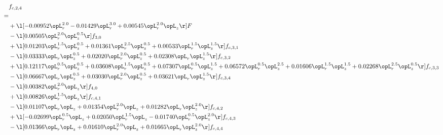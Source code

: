 \begin{alignat}{2} 
\label{eq:f_24_2} 
& f_{c,2,4} \nonumber \\ 
 = \\ 
& + \l[  -0.00952 \opL_r^{2.0}   -0.01429 \opL_r^{3.0} +  0.00545 \opL_r^{2.0} \opL_z  \r] F \nonumber \\ 
& - \l[  0.00505 \opL_r^{2.0} \opL_z^{0.5}  \r] f_{3,0} \nonumber \\ 
& + \l[  0.01203 \opL_r^{1.5} \opL_z^{0.5} +  0.01361 \opL_r^{2.5} \opL_z^{0.5} +  0.00533 \opL_r^{1.5} \opL_z^{1.5}  \r] f_{c,3,1} \nonumber \\ 
& - \l[  0.03333 \opL_r \opL_z^{0.5} +  0.02020 \opL_r^{2.0} \opL_z^{0.5} +  0.02308 \opL_r \opL_z^{1.5}  \r] f_{c,3,2} \nonumber \\ 
& + \l[  0.12117 \opL_r^{0.5} \opL_z^{0.5} +  0.03608 \opL_r^{1.5} \opL_z^{0.5} +  0.07307 \opL_r^{0.5} \opL_z^{1.5} +  0.06572 \opL_r^{0.5} \opL_z^{2.5} +  0.01606 \opL_r^{1.5} \opL_z^{1.5} +  0.02268 \opL_r^{2.5} \opL_z^{0.5}  \r] f_{c,3,3} \nonumber \\ 
& - \l[  0.06667 \opL_r \opL_z^{0.5} +  0.03030 \opL_r^{2.0} \opL_z^{0.5} +  0.03621 \opL_r \opL_z^{1.5}  \r] f_{c,3,4} \nonumber \\ 
& - \l[  0.00382 \opL_r^{2.0} \opL_z  \r] f_{4,0} \nonumber \\ 
& + \l[  0.00826 \opL_r^{1.5} \opL_z  \r] f_{c,4,1} \nonumber \\ 
& - \l[  0.01107 \opL_r \opL_z +  0.01354 \opL_r^{2.0} \opL_z +  0.01282 \opL_r \opL_z^{2.0}  \r] f_{c,4,2} \nonumber \\ 
& + \l[  -0.02699 \opL_r^{0.5} \opL_z +  0.02050 \opL_r^{1.5} \opL_z   -0.01740 \opL_r^{0.5} \opL_z^{2.0}  \r] f_{c,4,3} \nonumber \\ 
& - \l[  0.01366 \opL_r \opL_z +  0.01610 \opL_r^{2.0} \opL_z +  0.01665 \opL_r \opL_z^{2.0}  \r] f_{c,4,4} \nonumber \\ 
\end{alignat} 


